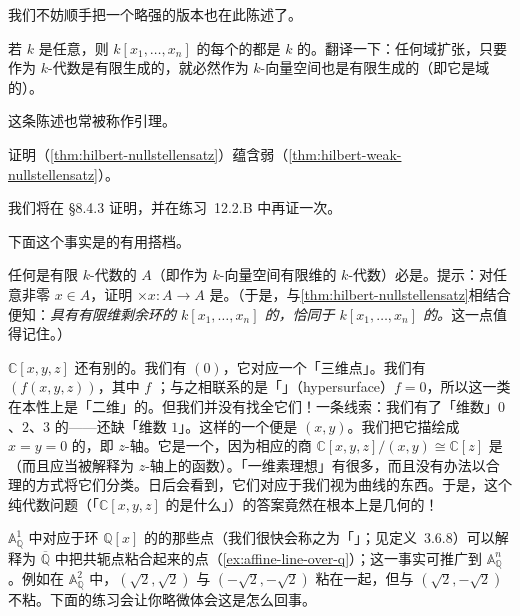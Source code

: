 我们不妨顺手把一个略强的版本也在此陈述了。

\begin{theorem}[\trHilbert{}\trNullstellensatz]\label{thm:hilbert-nullstellensatz}
若 $k$ 是任意\trField，则 $k[x_1,\dots,x_n]$ 的每个\trMaximalIdeal{}的\trResidueField{}都是 $k$ 的\trFiniteFieldExtension。翻译一下：任何域扩张，只要作为 $k$-代数是有限生成的，就必然作为 $k$-向量空间也是有限生成的（即它是域的\trFiniteFieldExtension）。
\end{theorem}

这条陈述也常被称作\trZariski{}引理。

\begin{exercise}\label{ex:hilbert-nullstellensatz-implies-weak}
证明\trNullstellensatz（\cref{thm:hilbert-nullstellensatz}）蕴含弱\trNullstellensatz（\cref{thm:hilbert-weak-nullstellensatz}）。
\end{exercise}

我们将在 \S8.4.3 证明\trNullstellensatz，并在练习~12.2.B 中再证一次。

下面这个事实是\trNullstellensatz{}的有用搭档。

\begin{exercise}[无须\trNullstellensatz]\label{ex:finite-algebra-domain-field}
任何是有限 $k$-代数的\trIntegralDomain{} $A$（即作为 $k$-向量空间有限维的 $k$-代数）必是\trField。提示：对任意非零 $x\in A$，证明 $\times x\colon A\to A$ 是\trIsomorphism。（于是，与\cref{thm:hilbert-nullstellensatz}相结合便知：\emph{具有有限维剩余环的 $k[x_1,\dots,x_n]$ 的\trPrimeIdeal，恰同于 $k[x_1,\dots,x_n]$ 的\trMaximalIdeal。}这一点值得记住。）
\end{exercise}

$\mathbb{C}[x,y,z]$ 还有别的\trPrimeIdeal。我们有 $(0)$，它对应一个「三维点」。我们有 $(f(x,y,z))$，其中 $f$ \trIrreducible；与之相联系的是「\trHypersurface」（hypersurface）$f=0$，所以这一类在本性上是「二维」的。但我们并没有找全它们！一条线索：我们有了「维数」$0$、$2$、$3$ 的\trPrimeIdeal——还缺「维数 $1$」。这样的一个\trPrimeIdeal{}便是 $(x,y)$。我们把它描绘成 $x=y=0$ 的\trLocus，即 $z$-轴。它是一个\trPrimeIdeal，因为相应的商 $\mathbb{C}[x,y,z]/(x,y)\cong\mathbb{C}[z]$ 是\trIntegralDomain（而且应当被解释为 $z$-轴上的函数）。「一维素理想」有很多，而且没有办法以合理的方式将它们分类。日后会看到，它们对应于我们视为\trIrreducible{}曲线的东西。于是，这个纯代数问题（「$\mathbb{C}[x,y,z]$ 的\trPrimeIdeal{}是什么」）的答案竟然在根本上是几何的！

$\mathbb{A}^1_{\mathbb{Q}}$ 中对应于环 $\mathbb{Q}[x]$ 的\trMaximalIdeal{}的那些点（我们很快会称之为「\trClosedPoint」；见定义~3.6.8）可以解释为 $\overline{\mathbb{Q}}$ 中把\trGalois{}共轭点粘合起来的点（\cref{ex:affine-line-over-q}）；这一事实可推广到 $\mathbb{A}^n_{\mathbb{Q}}$。例如在 $\mathbb{A}^2_{\mathbb{Q}}$ 中，$(\sqrt{2},\sqrt{2})$ 与 $(-\sqrt{2},-\sqrt{2})$ 粘在一起，但与 $(\sqrt{2},-\sqrt{2})$ 不粘。下面的练习会让你略微体会这是怎么回事。

